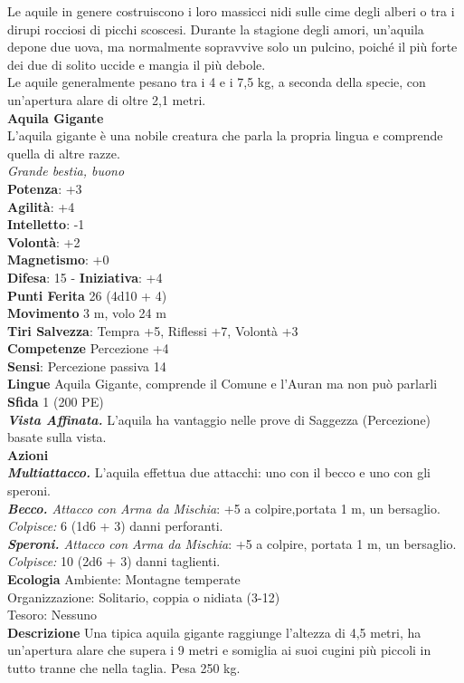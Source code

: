 \begin{multicols}{2}
Le aquile in genere costruiscono i loro massicci nidi sulle cime degli alberi o tra i dirupi rocciosi di picchi scoscesi. Durante la stagione degli amori, un’aquila depone due uova, ma normalmente sopravvive solo un pulcino, poiché il più forte dei due di solito uccide e mangia il più debole.\\

Le aquile generalmente pesano tra i 4 e i 7,5 kg, a seconda della specie, con un’apertura alare di oltre 2,1 metri.\\

\medskip\textbf{Aquila Gigante}\\
L'aquila gigante è una nobile creatura che parla la propria lingua e comprende quella di altre razze.\\
\emph{Grande bestia, buono}\\
\textbf{Potenza}: +3\\
\textbf{Agilità}: +4\\
\textbf{Intelletto}: -1\\
\textbf{Volontà}: +2\\
\textbf{Magnetismo}: +0\\
\textbf{Difesa}: 15 - \textbf{Iniziativa}: +4\\
\textbf{Punti Ferita} 26 (4d10 + 4)\\
\textbf{Movimento} 3 m, volo 24 m\\
\textbf{Tiri Salvezza}: Tempra +5, Riflessi +7, Volontà +3\\
\textbf{Competenze} Percezione +4\\
\textbf{Sensi}: Percezione passiva 14\\
\textbf{Lingue} Aquila Gigante, comprende il Comune e l'Auran ma non può parlarli\\
\textbf{Sfida} 1 (200 PE)\smallskip\\
\emph{\textbf{Vista Affinata.}} L'aquila ha vantaggio nelle prove di Saggezza (Percezione) basate sulla vista.\\
\smallskip\textbf{Azioni}\\
\emph{\textbf{Multiattacco.}} L'aquila effettua due attacchi: uno con il becco e uno con gli speroni.\\
\emph{\textbf{Becco.} Attacco con Arma da Mischia}: +5 a colpire,portata 1 m, un bersaglio.\\
\emph{Colpisce:} 6 (1d6 + 3) danni perforanti.\\
\emph{\textbf{Speroni.} Attacco con Arma da Mischia}: +5 a colpire, portata 1 m, un bersaglio.\\
\emph{Colpisce:} 10 (2d6 + 3) danni taglienti.\\
\textbf{Ecologia}
Ambiente: Montagne temperate\\
Organizzazione: Solitario, coppia o nidiata (3-12)\\
Tesoro: Nessuno\\
\textbf{Descrizione}
Una tipica aquila gigante raggiunge l’altezza di 4,5 metri, ha un’apertura alare che supera i 9 metri e somiglia ai suoi cugini più piccoli in tutto tranne che nella taglia. Pesa 250 kg.\\


\end{multicols}
